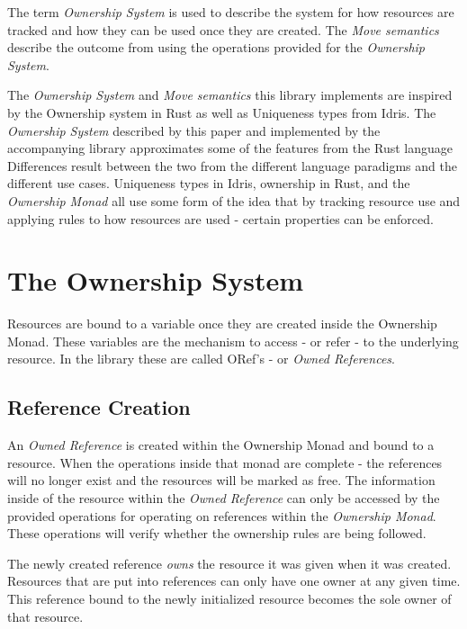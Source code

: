 \documentclass[onehalf,11pt]{beavtex}
\begin{document}
The term \textit{Ownership System} is used to describe the system for how
resources are tracked and how they can be used once they are created.
The \textit{Move semantics} describe the outcome from using the operations provided
for the \textit{Ownership System}.

The \textit{Ownership System} and \textit{Move semantics} this library
implements are inspired by the Ownership system in Rust as well as
Uniqueness types from Idris. \cite{rust_book_ownership} \cite{idris_uniqueness_types}
The \textit{Ownership System} described by this paper and implemented by the
accompanying library approximates some of the features from the Rust language
Differences result between the two from the different language paradigms and
the different use cases. Uniqueness types in Idris, ownership in Rust, and
the \textit{Ownership Monad} all use some form of the idea that by tracking
resource use and applying rules to how resources are used - certain properties
can be enforced.

\section{The Ownership System}

Resources are bound to a variable once they are created inside the Ownership
Monad.  These variables are the mechanism to access - or refer - to the
underlying resource.  In the library these are called ORef's -
or \textit{Owned References}.

\subsection{Reference Creation}

An \textit{Owned Reference} is created within the Ownership Monad and bound to a
resource. When the operations inside that monad are complete - the references
will no longer exist and the resources will be marked as free.
The information inside of the resource within the \textit{Owned Reference} can
only be accessed by the provided operations for operating on references within
the \textit{Ownership Monad}.  These operations will verify whether the
ownership rules are being followed.

The newly created reference \textit{owns} the resource it was given
when it was created. Resources that are put into references can only have one
owner at any given time. This reference bound to the newly initialized resource
becomes the sole owner of that resource.
\end{document}
